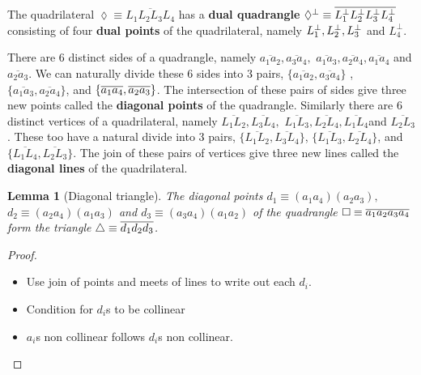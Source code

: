 \documentclass[11pt]{article}
\newtheorem{theorem}{Theorem}
\newtheorem{theorem}{Lemma}
\begin{document}
The quadrilateral $\lozenge\equiv \overline{L_{1}L_{2}L_{3}L_{4}}$ has a 
\textbf{dual quadrangle} $\lozenge^{\perp}\equiv\overline{%
L_{1}^{\perp}L_{2}^{\perp}L_{3}^{\perp}L_{4}^{\perp}}$ consisting of four 
\textbf{dual points} of the quadrilateral, namely $L_{1}^{\perp},L_{2}^{%
\perp},L_{3}^{\perp}$ and $L_{4}^{\perp}$.\newline

There are 6 distinct sides of a quadrangle, namely $\overline{a_{1}a_{2}},%
\overline{a_{3}a_{4}},$ $\overline{a_{1}a_{3}},\overline{a_{2}a_{4}},%
\overline{a_{1}a_{4}}$ and $\overline{a_{2}a_{3}}$. We can naturally divide
these 6 sides into 3 pairs, $\{\overline{a_{1}a_{2}},\overline{a_{3}a_{4}}\}$%
, $\{\overline{a_{1}a_{3}},\overline{a_{2}a_{4}}\}$, and $\{\overline{%
a_{1}a_{4}},\overline{a_{2}a_{3}}\}$. The intersection of these pairs of
sides give three new points called the \textbf{diagonal points} of the
quadrangle.\newline
Similarly there are 6 distinct vertices of a quadrilateral, namely $%
\overline{L_{1}L_{2}},\overline{L_{3}L_{4}},$ $\overline{L_{1}L_{3}},%
\overline{L_{2}L_{4}},\overline{L_{1}L_{4}}$and $\overline{L_{2}L_{3}}$.
These too have a natural divide into 3 pairs, $\{\overline{L_{1}L_{2}},%
\overline{L_{3}L_{4}}\}$, $\{\overline{L_{1}L_{3}},\overline{L_{2}L_{4}}\}$,
and $\{\overline{L_{1}L_{4}},\overline{L_{2}L_{3}}\}$. The join of these
pairs of vertices give three new lines called the \textbf{diagonal lines} of
the quadrilateral.\newline

\begin{theorem}[Diagonal triangle]
The diagonal points $d_{1}\equiv(a_{1}a_{4})(a_{2}a_{3}),$\newline
$d_{2}\equiv(a_{2}a_{4})(a_{1}a_{3})$ and $d_{3}%
\equiv(a_{3}a_{4})(a_{1}a_{2})$ of the quadrangle $\square\equiv\overline{%
a_{1}a_{2}a_{3}a_{4}}$ form the triangle $\triangle\equiv\overline{%
d_{1}d_{2}d_{3}}$.
\end{theorem}

\begin{proof}
\begin{itemize}
\item Use join of points and meets of lines to write out each $d_{i}$.
\item Condition for $d_{i}$s to be collinear
\item $a_{i}$s non collinear follows $d_{i}$s non collinear.
\end{itemize}
\end{proof}
\end{document}
